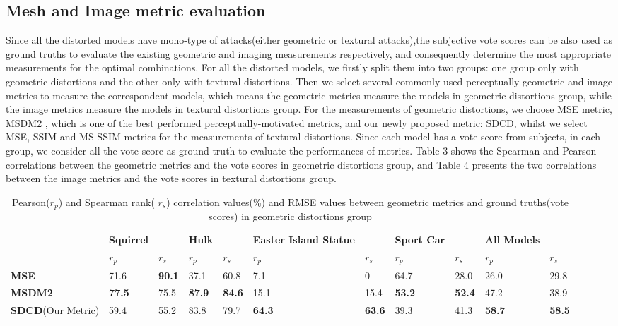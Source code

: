 \subsection{Mesh and  Image metric evaluation}
Since all the distorted models have mono-type of attacks(either geometric or textural attacks),the subjective vote scores can be also used as ground truths to evaluate the existing geometric and imaging measurements respectively, and consequently determine the most appropriate measurements for the optimal combinations. For all the distorted models, we firstly split them into two groups: one group only with geometric distortions and the other only with textural distortions. Then we select several commonly used perceptually geometric and image metrics to measure the correspondent models, which means the geometric metrics measure the models in geometric distortions group, while the image metrics measure the models in textural distortions group. For the measurements of geometric distortions, we choose MSE metric, MSDM2 \cite{Lavou__2011}, which is one of the best performed perceptually-motivated metrics, and our newly proposed metric: SDCD, whilst we select MSE, SSIM \cite{Wang_2004} and MS-SSIM \cite{Wang} metrics for the measurements of textural distortions.  Since each model has a vote score from subjects, in each group, we consider all the vote score as ground truth to evaluate the performances of metrics.  Table 3 shows the Spearman and Pearson correlations between the geometric metrics and the vote scores in geometric distortions group, and Table 4 presents the two correlations between the image metrics and the vote scores in textural distortions group.\\
\begin{table}[]
\centering
\caption{Pearson($r_p$) and Spearman rank( $r_s$) correlation values(\%) and RMSE values between geometric metrics and ground truths(vote scores) in geometric distortions group}
\label{my-label}
\begin{tabular}{lllllllllll}
                          &  \textbf{Squirrel} & \textbf{} & \textbf{Hulk} & \textbf{} & \textbf{Easter Island Statue} & \textbf{} & \textbf{Sport Car} & \textbf{} & \textbf{All Models} &      \\
                          & $r_p$        & $r_s$        & $r_p$            & $r_s$        & $r_p$               & $r_s$        & $r_p$                & $r_s$       & $r_p$                  & $r_s$   \\
 \textbf{MSE}           & 71.6 & \textbf{90.1} & 37.1 & 60.8 & 7.1  &  0        & 64.7 & 28.0 & 26.0          & 29.8         \\
\textbf{MSDM2} \cite{Lavou__2011}            & \textbf{77.5} & 75.5 & \textbf{87.9} & \textbf{84.6} & 15.1                 & 15.4          & \textbf{53.2} & \textbf{52.4} & 47.2          & 38.9          \\
\textbf{SDCD}(Our Metric) & 59.4          & 55.2          & 83.8          & 79.7          & \textbf{64.3}        & \textbf{63.6} & 39.3          & 41.3          & \textbf{58.7} & \textbf{58.5}
\end{tabular}
\end{table}

